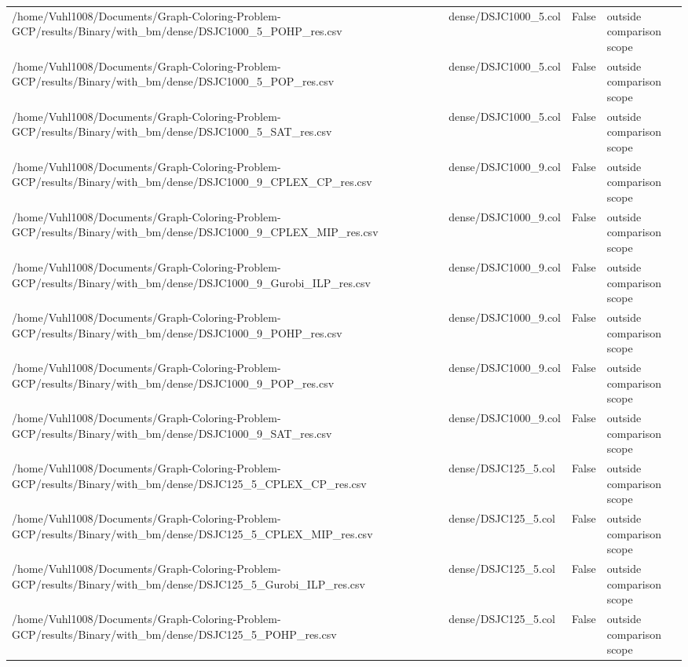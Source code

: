 \begin{table}[htbp]
\begin{tabular}{llll}
/home/Vuhl1008/Documents/Graph-Coloring-Problem-GCP/results/Binary/with\_bm/dense/DSJC1000\_5\_POHP\_res.csv & dense/DSJC1000\_5.col & False & outside comparison scope \\
/home/Vuhl1008/Documents/Graph-Coloring-Problem-GCP/results/Binary/with\_bm/dense/DSJC1000\_5\_POP\_res.csv & dense/DSJC1000\_5.col & False & outside comparison scope \\
/home/Vuhl1008/Documents/Graph-Coloring-Problem-GCP/results/Binary/with\_bm/dense/DSJC1000\_5\_SAT\_res.csv & dense/DSJC1000\_5.col & False & outside comparison scope \\
/home/Vuhl1008/Documents/Graph-Coloring-Problem-GCP/results/Binary/with\_bm/dense/DSJC1000\_9\_CPLEX\_CP\_res.csv & dense/DSJC1000\_9.col & False & outside comparison scope \\
/home/Vuhl1008/Documents/Graph-Coloring-Problem-GCP/results/Binary/with\_bm/dense/DSJC1000\_9\_CPLEX\_MIP\_res.csv & dense/DSJC1000\_9.col & False & outside comparison scope \\
/home/Vuhl1008/Documents/Graph-Coloring-Problem-GCP/results/Binary/with\_bm/dense/DSJC1000\_9\_Gurobi\_ILP\_res.csv & dense/DSJC1000\_9.col & False & outside comparison scope \\
/home/Vuhl1008/Documents/Graph-Coloring-Problem-GCP/results/Binary/with\_bm/dense/DSJC1000\_9\_POHP\_res.csv & dense/DSJC1000\_9.col & False & outside comparison scope \\
/home/Vuhl1008/Documents/Graph-Coloring-Problem-GCP/results/Binary/with\_bm/dense/DSJC1000\_9\_POP\_res.csv & dense/DSJC1000\_9.col & False & outside comparison scope \\
/home/Vuhl1008/Documents/Graph-Coloring-Problem-GCP/results/Binary/with\_bm/dense/DSJC1000\_9\_SAT\_res.csv & dense/DSJC1000\_9.col & False & outside comparison scope \\
/home/Vuhl1008/Documents/Graph-Coloring-Problem-GCP/results/Binary/with\_bm/dense/DSJC125\_5\_CPLEX\_CP\_res.csv & dense/DSJC125\_5.col & False & outside comparison scope \\
/home/Vuhl1008/Documents/Graph-Coloring-Problem-GCP/results/Binary/with\_bm/dense/DSJC125\_5\_CPLEX\_MIP\_res.csv & dense/DSJC125\_5.col & False & outside comparison scope \\
/home/Vuhl1008/Documents/Graph-Coloring-Problem-GCP/results/Binary/with\_bm/dense/DSJC125\_5\_Gurobi\_ILP\_res.csv & dense/DSJC125\_5.col & False & outside comparison scope \\
/home/Vuhl1008/Documents/Graph-Coloring-Problem-GCP/results/Binary/with\_bm/dense/DSJC125\_5\_POHP\_res.csv & dense/DSJC125\_5.col & False & outside comparison scope \\

\end{tabular}
\end{table}
